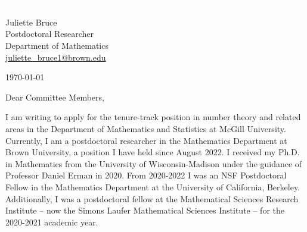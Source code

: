 \documentclass[11pt]{article}
\begin{document}
\section*{}

\noindent
\begin{minipage}{0.99\textwidth}
\begin{minipage}{0.69\textwidth}
\textcolor{white}{.}
\end{minipage}
\begin{minipage}{0.29\textwidth}
{
Juliette Bruce \\
Postdoctoral Researcher \\
Department of Mathematics \\
\href{mailto:juliette\_bruce1@brown.edu}{juliette\_bruce1@brown.edu}
}

\vspace{12pt}
\today
\end{minipage}
\end{minipage}


\vspace{12pt}
\noindent
Dear Committee Members,

I am writing to apply for the tenure-track position in number theory and related areas in the Department of Mathematics and Statistics at McGill University. Currently, I am a postdoctoral researcher in the Mathematics Department at Brown University, a position I have held since August 2022. I received my Ph.D. in Mathematics from the University of Wisconsin-Madison under the guidance of Professor Daniel Erman in 2020. From 2020-2022 I was an NSF Postdoctoral Fellow in the Mathematics Department at the University of California, Berkeley. Additionally, I was a postdoctoral fellow at the Mathematical Sciences Research Institute -- now the Simons Laufer Mathematical Sciences Institute -- for the 2020-2021 academic year.
\end{document}
